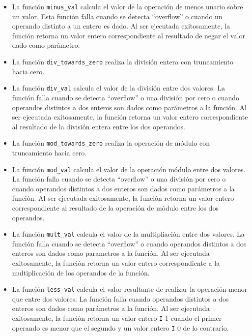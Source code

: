 \begin{itemize}
\item{La función \verb|minus_val| calcula el valor de la operación de menos unario sobre un valor.
Esta función falla cuando se detecta ``overflow'' o cuando un operando distinto a un entero es dado.
Al ser ejecutada exitosamente, la función retorna un valor entero correspondiente al resultado de negar el valor dado como parámetro.}

\item{La función \verb|div_towards_zero| realiza la división entera con truncamiento hacia cero.}

\item{La función \verb|div_val| calcula el valor de la división entre dos valores.
La función falla cuando se detecta ``overflow'' o una división por cero o cuando operandos distintos a dos enteros son dados como parámetros a la función.
Al ser ejecutada exitosamente, la función retorna un valor entero correspondiente al resultado de la división entera entre los dos operandos.}

\item{La función \verb|mod_towards_zero| realiza la operación de módulo con truncamiento hacia cero.}

\item{La función \verb|mod_val| calcula el valor de la operación módulo entre dos valores.
La función falla cuando se detecta ``overflow'' o una división por cero o cuando operandos distintos a dos enteros son dados como parámetros a la función.
Al ser ejecutada exitosamente, la función retorna un valor entero correspondiente al resultado de la operación de módulo entre los dos operandos.}

\item{La función \verb|mult_val| calcula el valor de la multipliación entre dos valores.
La función falla cuando se detecta ``overflow'' o cuando operandos distintos a dos enteros son dados como parametros a la función. 
Al ser ejecutada exitosamente, la función retorna un valor entero correspondiente a la multiplicación de los operandos de la función.}

\item{La función \verb|less_val| calcula el valor resultante de realizar la operación menor que entre dos valores.
La función falla cuando operandos distintos a dos enteros son dados como parámetros a la función.
Al ser ejecutada exitosamente, la función retorna un valor entero \verb|I| $1$ cuando el primer operando es menor que el segundo y un valor entero \verb|I| $0$ de lo contrario.}


\end{itemize}

